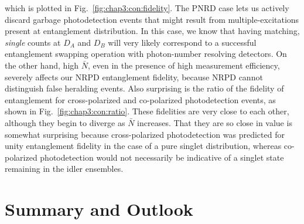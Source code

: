 \documentclass[aps,twocolumn,secnumarabic,amsmath,amssymb,pra,groupedaddress,
showpacs, showkeys,draft]{revtex4-1}
\begin{document}
which is plotted in Fig.~\ref{fig:chap3:con:fidelity}. The PNRD case lets us
actively discard garbage photodetection events that might result from
multiple-excitations present at entanglement distribution. In this case, we
know that having matching, \emph{single} counts at $D_A$ and $D_B$ will very
likely correspond to a successful entanglement swapping operation with
photon-number resolving detectors. On the other hand, high $\bar{N}$, even in
the presence of high measurement efficiency, severely affects our NRPD
entanglement fidelity, because NRPD cannot distinguish false heralding
events. Also surprising is the ratio of the fidelity of entanglement for
cross-polarized and co-polarized photodetection events, as shown in
Fig.~\ref{fig:chap3:con:ratio}. These fidelities are very close to each other,
although they begin to diverge as $\bar{N}$ increases. That they are so close
in value is somewhat surprising because cross-polarized photodetection was
predicted for unity entanglement fidelity in the case of a pure singlet
distribution, whereas co-polarized photodetection would not necessarily be
indicative of a singlet state remaining in the idler ensembles.


\section{Summary and Outlook~\label{chap:conclusion}}
\end{document}
